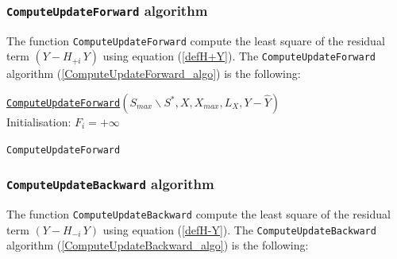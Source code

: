 \newpage
\subsubsection{\texttt{ComputeUpdateForward} algorithm}

 The function \texttt{ComputeUpdateForward} compute the least square of the residual term $(Y-H_{+i}\,Y)$ using equation (\ref{defH+Y}).
 The \texttt{ComputeUpdateForward} algorithm (\ref{ComputeUpdateForward_algo}) is the following:

\begin{algorithm}
\label{ComputeUpdateForward_algo}
\underline{\texttt{ComputeUpdateForward}}$(S_{max} \backslash S^*,X,X_{max},L_X,Y-\hat{Y})$\\
\BlankLine
Initialisation: $F_i = +\infty$
\BlankLine
{}
\caption{\texttt{ComputeUpdateForward} }
\end{algorithm}

\subsubsection{\texttt{ComputeUpdateBackward} algorithm}

The function \texttt{ComputeUpdateBackward} compute the least square of the residual term  $(Y-H_{-i}\,Y)$ using equation (\ref{defH-Y}).
 The \texttt{ComputeUpdateBackward} algorithm (\ref{ComputeUpdateBackward_algo}) is the following:


